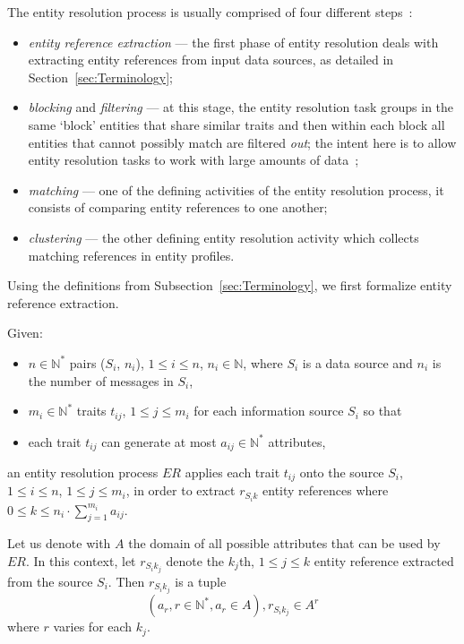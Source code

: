 The entity resolution process is usually comprised of four different steps~\cite{Pap19,Tal11}:

\begin{itemize}
    \item \textit{entity reference extraction} --- the first phase of entity
    resolution deals with extracting entity references from input data
    sources, as detailed in Section~\ref{sec:Terminology};
    \item \textit{blocking} and \textit{filtering} --- at this stage, the
    entity resolution task groups in the same `block' entities that share
    similar traits and then within each block all entities that cannot
    possibly match are filtered \textit{out}; the intent here is to allow
    entity resolution tasks to work with large amounts of data~\cite{Pap19};
    \item \textit{matching} --- one of the defining activities of the entity
    resolution process, it consists of comparing entity references to one
    another;
    \item \textit{clustering} --- the other defining entity resolution
    activity which collects matching references in entity profiles.
\end{itemize}

Using the definitions from Subsection~\ref{sec:Terminology}, we first formalize
entity reference extraction.

Given:
\begin{itemize}
    \item $n \in \mathbb{N}^*$ pairs ($S_i$, $n_i$), $1 \leq i \leq n$, $n_i \in \mathbb{N}$, 
    where $S_i$ is a data source and $n_i$ is the number of messages in
    $S_i$,
    \item $m_i \in \mathbb{N}^*$ traits $t_{ij}$, $1 \leq j \leq m_i$ for each
    information source $S_i$ so that
    \item each trait $t_{ij}$ can generate at most $a_{ij} \in \mathbb{N}^*$
    attributes,
\end{itemize}
an entity resolution process $ER$ applies each trait $t_{ij}$ onto the source
$S_i$, $1 \leq i \leq n$, $1 \leq j \leq m_i$, in order to extract
$r_{{S_i}k}$ entity references where
$0 \leq k \leq n_i \cdot \sum^{m_i}_{j=1}a_{ij}$.

Let us denote with $A$ the domain of all possible attributes that can be
used by $ER$.
In this context, let $r_{{S_i}{k_j}}$ denote the $k_j$th, $1 \leq j \leq k$
entity reference extracted from the source $S_i$.
Then $r_{{S_i}{k_j}}$ is a tuple
\[
    (a_r, r \in \mathbb{N}^*, a_r \in A), r_{{S_i}{k_j}} \in A^r
\]
where $r$ varies for each $k_j$.

